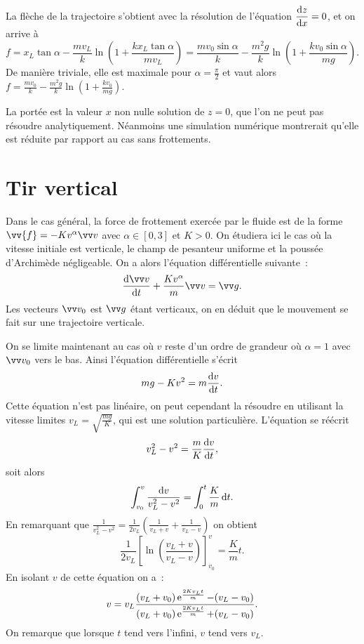 La flèche de la trajectoire s'obtient avec la résolution de l'équation $\dfrac{\mathrm{d} z}{\mathrm{d} x}=0$, et on arrive à
\begin{equation}
  f = x_L \tan \alpha - \frac{mv_L}{k}\ln\left(1 + \frac{k x_L \tan \alpha}{m v_L}\right) = \frac{m v_0 \sin \alpha}{k} - \frac{m^2 g}{k}\ln\left(1 + \frac{k v_0 \sin \alpha}{m g}\right).
\end{equation}
De manière triviale, elle est maximale pour $\alpha = \frac{\pi}{2}$ et vaut alors $f =  \frac{m v_0}{k} - \frac{m^2 g}{k}\ln\left(1 + \frac{k v_0}{m g}\right)$.

La portée est la valeur $x$ non nulle solution de $z=0$, que l'on ne peut pas résoudre analytiquement. Néanmoins une simulation numérique montrerait qu'elle est réduite par rapport au cas sans frottements.

\section{Tir vertical}
\label{chap3-sec:tirvertical}

Dans le cas général, la force de frottement exercée par le fluide est de la forme $\vv{f}=-Kv^\alpha\vvv$ avec $\alpha \in [0, 3]$ et $K>0$. On étudiera ici le cas où la vitesse initiale est verticale, le champ de pesanteur uniforme et la poussée d'Archimède négligeable. On a alors l'équation différentielle suivante~:
\begin{equation}
  \derived{\vvv}{t} + \frac{Kv^\alpha}{m}\vvv = \vg.
\end{equation}
Les vecteurs $\vvv_0$ est $\vg$ étant verticaux, on en déduit que le mouvement se fait sur une trajectoire verticale.

On se limite maintenant au cas où $v$ reste d'un ordre de grandeur où $\alpha=1$ avec $\vvv_0$ vers le bas. Ainsi l'équation différentielle s'écrit
\begin{equation}
  mg -Kv^2 = m\dfrac{\mathrm{d} v}{\mathrm{d} t}.
\end{equation}
Cette équation n'est pas linéaire, on peut cependant la résoudre en utilisant la vitesse limites $v_L = \sqrt{\frac{mg}{K}}$, qui est une solution particulière. L'équation se réécrit
\begin{equation}
  v_L^2-v^2 = \frac{m}{K}\dfrac{\mathrm{d} v}{\mathrm{d} t},
\end{equation}
soit alors
\begin{equation}
  \int_{v_0}^v \frac{\mathop{}\mathopen{}\mathrm{d} v}{v_L^2-v^2} = \int_0^t\frac{K}{m}\mathop{}\mathopen{}\mathrm{d} t.
\end{equation}
En remarquant que $\frac{1}{v_L^2-v^2} = \frac{1}{2 v_L}\left(\frac{1}{v_L+v}+\frac{1}{v_L-v}\right)$ on obtient
\begin{equation}
  \frac{1}{2v_L}\left[\ln\left(\frac{v_L+v}{v_L-v}\right)\right]^{v}_{v_0} = \frac{K}{m}t.
\end{equation}
En isolant $v$ de cette équation on a~:
\begin{equation}
  v = v_L \frac{(v_L+v_0)\operatorname{e}^{\frac{2K v_L t}{m}}-(v_L-v_0)}{(v_L+v_0)\operatorname{e}^{\frac{2K v_L t}{m}}+(v_L-v_0)}.
\end{equation}
On remarque que lorsque $t$ tend vers l'infini, $v$ tend vers $v_L$.
